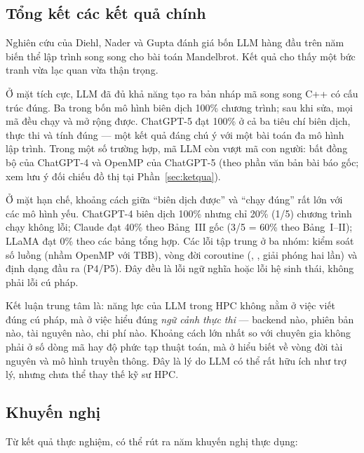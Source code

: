 \label{sec:ketluan}

\subsection{Tổng kết các kết quả chính}

Nghiên cứu của Diehl, Nader và Gupta đánh giá bốn LLM hàng đầu trên năm biến thể
lập trình song song cho bài toán Mandelbrot. Kết quả cho thấy một bức tranh vừa
lạc quan vừa thận trọng.

Ở mặt tích cực, LLM đã đủ khả năng tạo ra bản nháp mã song song C++ có cấu trúc
đúng. Ba trong bốn mô hình biên dịch 100\% chương trình; sau khi sửa, mọi mã đều
chạy và mở rộng được. ChatGPT-5 đạt 100\% ở cả ba tiêu chí biên dịch, thực thi và
tính đúng — một kết quả đáng chú ý với một bài toán đa mô hình lập trình. Trong
một số trường hợp, mã LLM còn vượt mã con người: bất đồng bộ của ChatGPT-4 và
OpenMP của ChatGPT-5 (theo phần văn bản bài báo gốc; xem lưu ý đối chiếu đồ thị
tại Phần~\ref{sec:ketqua}).

Ở mặt hạn chế, khoảng cách giữa “biên dịch được” và “chạy đúng” rất lớn với các
mô hình yếu. ChatGPT-4 biên dịch 100\% nhưng chỉ 20\% (1/5) chương trình chạy
không lỗi; Claude đạt 40\% theo Bảng~III gốc (3/5 = 60\% theo Bảng~I--II); LLaMA
đạt 0\% theo các bảng tổng hợp. Các lỗi tập trung ở ba nhóm: kiểm soát số luồng (nhầm OpenMP với TBB), vòng đời coroutine (,
, giải phóng hai lần) và định dạng đầu ra (P4/P5). Đây đều là
lỗi ngữ nghĩa hoặc lỗi hệ sinh thái, không phải lỗi cú pháp.

Kết luận trung tâm là: năng lực của LLM trong HPC không nằm ở việc viết đúng cú
pháp, mà ở việc hiểu đúng \emph{ngữ cảnh thực thi} — backend nào, phiên bản nào,
tài nguyên nào, chi phí nào. Khoảng cách lớn nhất so với chuyên gia không phải ở
số dòng mã hay độ phức tạp thuật toán, mà ở hiểu biết về vòng đời tài nguyên và
mô hình truyền thông. Đây là lý do LLM có thể rất hữu ích như trợ lý, nhưng chưa
thể thay thế kỹ sư HPC.

\subsection{Khuyến nghị}

Từ kết quả thực nghiệm, có thể rút ra năm khuyến nghị thực dụng:

